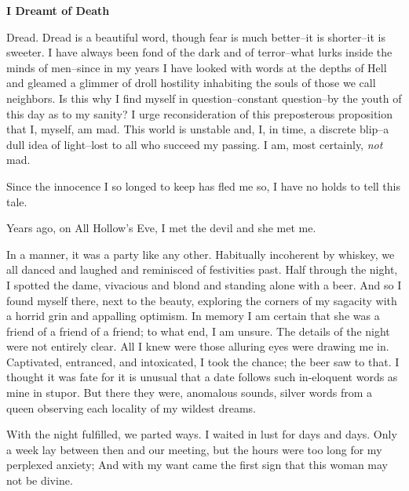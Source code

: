 \documentclass{article}
\begin{document}


\begin{center}
\large\textbf{I Dreamt of Death}
\end{center}


\noindent
Dread.
Dread is a beautiful word,
though fear is much better--it is shorter--it is sweeter.
I have always been fond of the dark and of terror--what
lurks inside the minds of men--since in my years
I have looked with words at the depths of Hell
and gleamed a glimmer of droll hostility
inhabiting the souls of those we call neighbors.
Is this why I find myself in question--constant question--by
the youth of this day as to my sanity?
I urge reconsideration of this preposterous proposition that
I, myself, am mad.
This world is unstable and, I, in time, a discrete blip--a
dull idea of light--lost to all who succeed my passing.
I am, most certainly, \textit{not} mad.
\VV


\noindent %
Since the innocence I so longed to keep has fled me so,
I have no holds to tell this tale. %
\VV


\noindent
Years ago, on All Hollow's Eve,
I met the devil and she met me.
\VV


\noindent
In a manner, it was a party like any other.
Habitually incoherent by whiskey,
we all danced and laughed and reminisced of festivities past.
Half through the night, I spotted the dame,
vivacious and blond and standing alone with a beer.
And so I found myself there, next to the beauty,
exploring the corners of my sagacity with a horrid
grin and appalling optimism.
In memory I am certain that she was a friend of
a friend of a friend; to what end, I am unsure.
The details of the night were not entirely clear.
All I knew were those alluring eyes were drawing me in.
Captivated, entranced, and intoxicated,
I took the chance; the beer saw to that.
I thought it was fate for it is unusual
that a date follows such in-eloquent words
as mine in stupor.
But there they were, anomalous sounds,
silver words from a queen observing each
locality of my wildest dreams.


With the night fulfilled, we parted ways.
I waited in lust for days and days.
Only a week lay between then and our meeting,
but the hours were too long for my perplexed anxiety;
And with my want came the first sign that this woman may not be divine.
\end{document}
